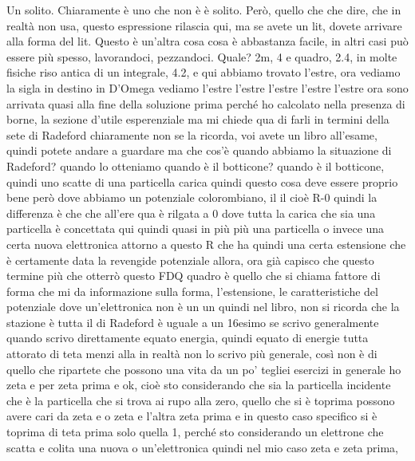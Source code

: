 \begin{soluzione}
{   Un solito. Chiaramente è uno che non è è solito. Però, quello che che dire, che in realtà non usa, questo espressione rilascia qui, ma se avete un lit, dovete arrivare alla forma del lit. Questo è un'altra cosa cosa è abbastanza facile, in altri casi può essere più spesso, lavorandoci, pezzandoci. Quale? 2m, 4 e quadro, 2.4, in molte fisiche riso antica di un integrale, 4.2, e qui abbiamo trovato l'estre, ora vediamo la sigla in destino in D'Omega vediamo l'estre l'estre l'estre l'estre l'estre ora sono arrivata quasi alla fine della soluzione prima perché ho calcolato nella presenza di borne, la sezione d'utile esperenziale ma mi chiede qua di farli in termini della sete di Radeford chiaramente non se la ricorda, voi avete un libro all'esame, quindi potete andare a guardare ma che cos'è quando abbiamo la situazione di Radeford? quando lo otteniamo quando è il botticone? quando è il botticone, quindi uno scatte di una particella carica quindi questo cosa deve essere proprio bene però dove abbiamo un potenziale colorombiano, il il cioè R-0 quindi la differenza è che che all'ere qua è rilgata a 0 dove tutta la carica che sia una particella è concettata qui quindi quasi in più più una particella o invece una certa nuova elettronica attorno a questo R che ha quindi una certa estensione che è certamente data la revengide potenziale allora, ora già capisco che questo termine più che otterrò questo FDQ quadro è quello che si chiama fattore di forma che mi da informazione sulla forma, l'estensione, le caratteristiche del potenziale dove un'elettronica non è un un quindi nel libro, non si ricorda che la stazione è tutta il di Radeford è uguale a un 16esimo se scrivo generalmente quando scrivo direttamente equato energia, quindi equato di energie tutta attorato di teta menzi alla in realtà non lo scrivo più generale, così non è di quello che ripartete che possono una vita da un po' tegliei esercizi in generale ho zeta e per zeta prima e ok, cioè sto considerando che sia la particella incidente che è la particella che si trova ai rupo alla zero, quello che si è toprima possono avere cari da zeta e o zeta e l'altra zeta prima e in questo caso specifico si è toprima di teta prima solo quella 1, perché sto considerando un elettrone che scatta e colita una nuova o un'elettronica quindi nel mio caso zeta e zeta prima, 
   
}
\end{soluzione}
